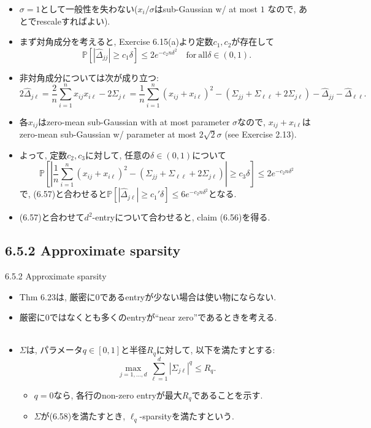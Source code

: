\documentclass[unicode,aspectratio=169,11pt]{beamer}
\newcommand{\bb}{\mathbb}
\begin{document}
\begin{frame}
  \begin{itemize}
    \item $\sigma = 1$として一般性を失わない($x_i/\sigma$はsub-Gaussian w/ at most $1$ なので, あとでrescaleすればよい).
    \item まず対角成分を考えると, Exercise 6.15(a)より定数$c_1, c_2$が存在して
          \[ \bb{P}[|\widehat{\Delta}_{jj}| \ge c_1\delta] \le 2e^{-c_2 n \delta^2} \quad \mathrm{for\ all} \delta \in (0, 1). \tag{6.57}\]
    \item 非対角成分については次が成り立つ:
          \[
            2 \widehat{\Delta}_{j \ell}
            =\frac{2}{n} \sum_{i=1}^{n} x_{i j} x_{i \ell}-2 \Sigma_{j \ell}
            =\frac{1}{n} \sum_{i=1}^{n}\left(x_{i j}+x_{i \ell}\right)^{2}-\left(\Sigma_{j j}+\Sigma_{\ell \ell}+2 \Sigma_{j \ell}\right)-\widehat{\Delta}_{j j}-\widehat{\Delta}_{\ell \ell}.
          \]
    \item 各$x_{ij}$はzero-mean sub-Gaussian with at most parameter $\sigma$なので, $x_{ij}+x_{i\ell}$はzero-mean sub-Gaussian w/ parameter at most $2\sqrt{2}\sigma$ (see Exercise 2.13).
    \item よって, 定数$c_2, c_3$に対して, 任意の$\delta \in (0,1)$について
          \[
            \bb{P}\left[ \left|\frac{1}{n}\sum_{i=1}^n (x_{ij}+x_{i\ell})^2 - (\Sigma_{jj}+\Sigma_{\ell\ell}+2\Sigma_{j\ell})\right| \ge c_3 \delta \right] \le 2 e^{- c_2 n \delta^2}
          \]
          で, (6.57)と合わせると$\bb{P}[|\widehat{\Delta}_{j\ell}| \ge c_1'\delta] \le 6e^{-c_2 n \delta^2}$となる.
    \item (6.57)と合わせて$d^2$-entryについて合わせると, claim (6.56)を得る.
  \end{itemize}
\end{frame}

\subsection{6.5.2 Approximate sparsity}
\begin{frame}{6.5.2 Approximate sparsity}{}
  \begin{itemize}
    \item Thm 6.23は, 厳密に$0$であるentryが少ない場合は使い物にならない.
    \item 厳密に$0$ではなくとも多くのentryが``near zero''であるときを考える.\\
          　\\
    \item $\Sigma$は, パラメータ$q\in[0,1]$と半径$R_q$に対して, 以下を満たすとする:
          \[
            \max_{j = 1,\dots, d} \sum_{\ell = 1}^d |\Sigma_{j\ell}|^q \le R_q.
            \tag{6.58}
          \]
          \begin{itemize}
            \item $q = 0$なら, 各行のnon-zero entryが最大$R_q$であることを示す.
            \item $\Sigma$が(6.58)を満たすとき, $\ell_q$-sparsityを満たすという.
          \end{itemize}
  \end{itemize}
\end{frame}
\end{document}
